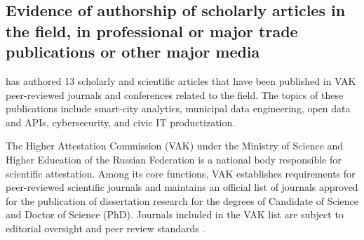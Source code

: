 
\subsection{Evidence of \mrls authorship of scholarly articles in the field, in professional or major trade publications or other major media}

\label{subsec:Articles}

\mrl{} has authored 13 scholarly and scientific articles that have been published in VAK peer-reviewed journals and conferences related to the field. The topics of these publications include smart-city analytics, municipal data engineering, open data and APIs, cybersecurity, and civic IT productization.

The Higher Attestation Commission (VAK) under the Ministry of Science and Higher Education of the Russian Federation is a national body responsible for scientific attestation. Among its core functions, VAK establishes requirements for peer-reviewed scientific journals and maintains an official list of journals approved for the publication of dissertation research for the degrees of Candidate of Science and Doctor of Science (PhD). Journals included in the VAK list are subject to editorial oversight and peer review standards .

